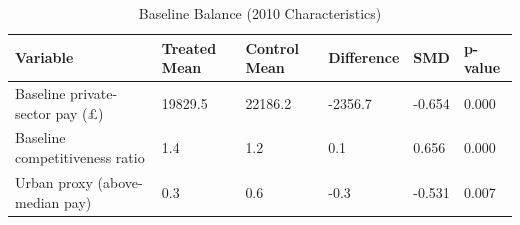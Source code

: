 \begin{table}[!h]
\centering
\caption{\label{tab:tab:balance}Baseline Balance (2010 Characteristics)}
\centering
\begin{tabular}[t]{llllll}
\toprule
Variable & Treated Mean & Control Mean & Difference & SMD & p-value\\
\midrule
Baseline private-sector pay (£) & 19829.5 & 22186.2 & -2356.7 & -0.654 & 0.000\\
Baseline competitiveness ratio & 1.4 & 1.2 & 0.1 & 0.656 & 0.000\\
Urban proxy (above-median pay) & 0.3 & 0.6 & -0.3 & -0.531 & 0.007\\
\bottomrule
\end{tabular}
\end{table}
